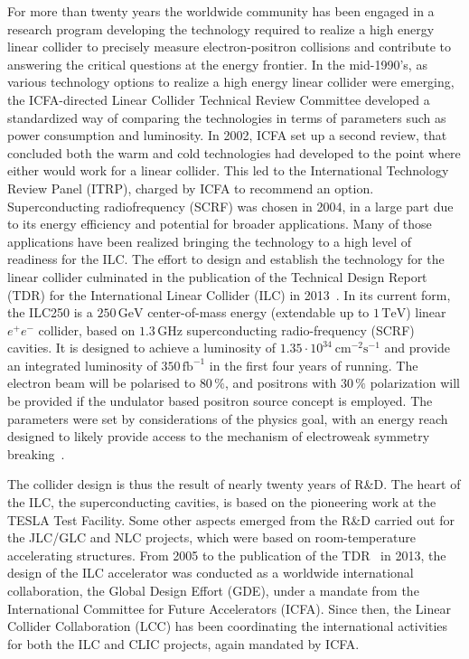 \documentclass[%
 reprint,
 amsmath,amssymb,
 aps,
]{revtex4-1}
\begin{document}
For more than twenty years the worldwide community has been engaged in a research program developing the technology required to realize a high energy linear collider to precisely measure electron-positron collisions and contribute to answering the critical questions at the energy frontier. In the mid-1990's, as various technology options to realize a high energy linear collider were emerging, the ICFA-directed Linear Collider Technical Review Committee developed a standardized way of comparing the  technologies in terms of parameters such as power consumption and luminosity. In 2002, ICFA set up a second review, that concluded both the warm and cold technologies had developed to the point where either would work for a linear collider. This led to the International Technology Review Panel (ITRP), charged by ICFA to recommend an option. Superconducting radiofrequency (SCRF) was chosen in 2004, in a large part due to its energy efficiency and potential for broader applications.  Many of those applications have been realized bringing the technology to a high level of readiness for the ILC. The effort to design and establish the technology for the linear collider culminated in the publication of the Technical Design Report (TDR) for the International Linear Collider (ILC) in 2013~\cite{Behnke:2013xla}. In its current form, the ILC250 is a $250\,{\mathrm{GeV}}$ center-of-mass energy (extendable up to $1\,{\mathrm{TeV}}$) linear $e^+e^-$ collider, based on $1.3\,{\mathrm{GHz}}$ superconducting radio-frequency (SCRF) cavities. It is designed to achieve a luminosity of $1.35\cdot 10^{34}~{\mathrm{cm}}^{-2}{\mathrm{s}}^{-1}$ and provide an integrated luminosity of $350\,{\mathrm{fb}}^{-1}$ in the first four years of running. The electron beam will be polarised to $80\,\%$, and positrons with $30\,\%$ polarization will be provided if the undulator based positron source concept is employed. The parameters were set by considerations of the physics goal, with an energy reach designed to likely provide access to the mechanism of electroweak symmetry breaking~\cite{Baer:2013cma}.


The collider design is thus the result of nearly twenty years of R\&D. The heart of the ILC, the superconducting cavities, is based on the pioneering work at the TESLA Test Facility. Some other aspects emerged from the R\&D carried out for the JLC/GLC and NLC projects, which were based on room-temperature accelerating structures. From 2005 to the publication of the TDR~\cite{Behnke:2013xla} in 2013, the design of the ILC accelerator was conducted as a worldwide international collaboration, the Global Design Effort (GDE), under a mandate from the International Committee for Future Accelerators (ICFA). Since then, the Linear Collider Collaboration (LCC) has been coordinating the international activities for both the ILC and CLIC projects, again mandated by ICFA.
\end{document}
